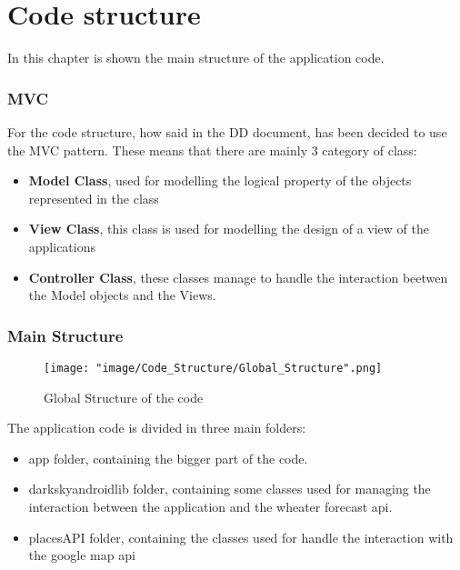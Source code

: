 \chapter{Code structure}

In this chapter is shown the main structure of the application code.

\subsection{MVC}
For the code structure, how said in the DD document, has been decided to use the MVC pattern. These means that there are mainly 3 category of class:
\begin{itemize}
\item \textbf{Model Class}, used for modelling the logical property of the objects represented in the class 

\item \textbf{View Class}, this class is used for modelling the design of a view of the applications

\item \textbf{Controller Class}, these classes manage to handle the interaction beetwen the Model objects and the Views.
\end{itemize}

\subsection{Main Structure}

\begin{figure}[H]
\begin{center}
\texttt{[image: "image/Code\_Structure/Global\_Structure".png]}
\caption{Global Structure of the code}
\end{center}
\end{figure}

The application code is divided in three main folders:

\begin{itemize}
\item app folder, containing the bigger part of the code. 
\item darkskyandroidlib folder, containing some classes used for managing the interaction between the application and the wheater forecast api. 
\item placesAPI folder, containing the classes used for handle the interaction with the google map api
\end{itemize}

